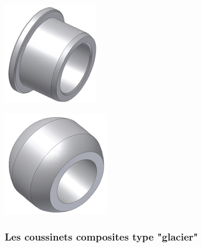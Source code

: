 \documentclass[11pt,oneside]{article}
\begin{document}
\begin{minipage}[c]{.23\linewidth}
\begin{center}
\includegraphics[width=.75\textwidth]{png/fig13}
\end{center}
\end{minipage}\hfill
\begin{minipage}[c]{.23\linewidth}
\begin{center}
\includegraphics[width=.75\textwidth]{png/fig14}
\end{center}
\end{minipage}

		 
\subsubsection{Les coussinets composites type "glacier"}
\end{document}

